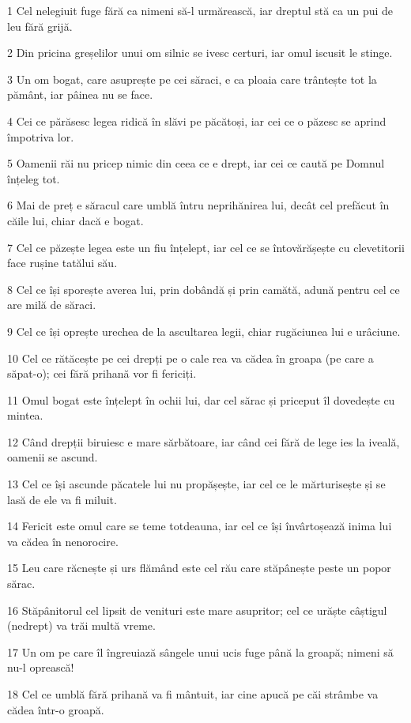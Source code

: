 \par 1 Cel nelegiuit fuge fără ca nimeni să-l urmărească, iar dreptul stă ca un pui de leu fără grijă.
\par 2 Din pricina greșelilor unui om silnic se ivesc certuri, iar omul iscusit le stinge.
\par 3 Un om bogat, care asuprește pe cei săraci, e ca ploaia care trântește tot la pământ, iar pâinea nu se face.
\par 4 Cei ce părăsesc legea ridică în slăvi pe păcătoși, iar cei ce o păzesc se aprind împotriva lor.
\par 5 Oamenii răi nu pricep nimic din ceea ce e drept, iar cei ce caută pe Domnul înțeleg tot.
\par 6 Mai de preț e săracul care umblă întru neprihănirea lui, decât cel prefăcut în căile lui, chiar dacă e bogat.
\par 7 Cel ce păzește legea este un fiu înțelept, iar cel ce se întovărășește cu clevetitorii face rușine tatălui său.
\par 8 Cel ce își sporește averea lui, prin dobândă și prin camătă, adună pentru cel ce are milă de săraci.
\par 9 Cel ce își oprește urechea de la ascultarea legii, chiar rugăciunea lui e urâciune.
\par 10 Cel ce rătăcește pe cei drepți pe o cale rea va cădea în groapa (pe care a săpat-o); cei fără prihană vor fi fericiți.
\par 11 Omul bogat este înțelept în ochii lui, dar cel sărac și priceput îl dovedește cu mintea.
\par 12 Când drepții biruiesc e mare sărbătoare, iar când cei fără de lege ies la iveală, oamenii se ascund.
\par 13 Cel ce își ascunde păcatele lui nu propășește, iar cel ce le mărturisește și se lasă de ele va fi miluit.
\par 14 Fericit este omul care se teme totdeauna, iar cel ce își învârtoșează inima lui va cădea în nenorocire.
\par 15 Leu care răcnește și urs flămând este cel rău care stăpânește peste un popor sărac.
\par 16 Stăpânitorul cel lipsit de venituri este mare asupritor; cel ce urăște câștigul (nedrept) va trăi multă vreme.
\par 17 Un om pe care îl îngreuiază sângele unui ucis fuge până la groapă; nimeni să nu-l oprească!
\par 18 Cel ce umblă fără prihană va fi mântuit, iar cine apucă pe căi strâmbe va cădea într-o groapă.
